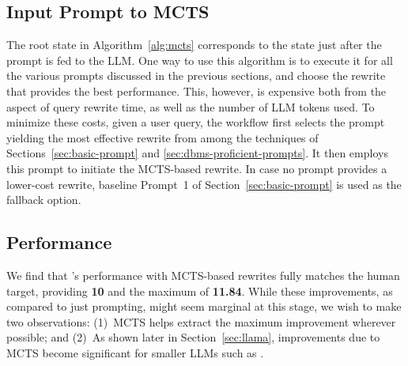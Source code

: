 \subsection{Input Prompt to MCTS}
%
The root state in Algorithm~\ref{alg:mcts} corresponds to the state just after the prompt is fed to the LLM. 
One way to use this algorithm is to execute it for all the various prompts discussed in the previous sections, and choose the rewrite that provides the best performance. 
This, however, is expensive both from the aspect of query rewrite time, as well as the number of LLM tokens used.
%
To minimize these costs, given a user query, the \lithe workflow first selects the prompt yielding the most effective rewrite from among the techniques of Sections~\ref{sec:basic-prompt} and \ref{sec:dbms-proficient-prompts}. It then employs this prompt to initiate the MCTS-based rewrite.
%
In case no prompt provides a lower-cost rewrite, baseline Prompt~1 of Section~\ref{sec:basic-prompt} is used as the fallback option.

\subsection{Performance}
We find that \lithe's performance with MCTS-based rewrites fully matches the human target, providing  \textbf{10} \cprs and the maximum \csgm of \textbf{11.84}. While these improvements, as compared to just prompting, might seem marginal at this stage, we wish to make two observations: (1)~MCTS helps extract the maximum improvement wherever possible; and (2)~As shown later in Section~\ref{sec:llama}, improvements due to MCTS become significant for smaller LLMs such as \llama.
%


